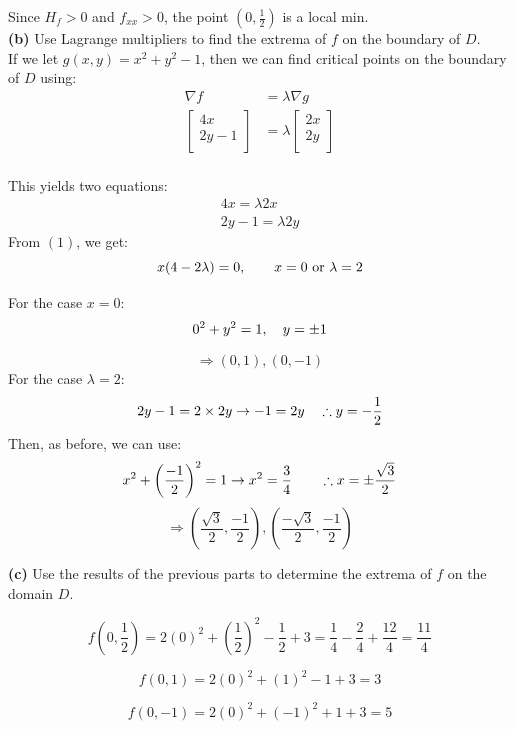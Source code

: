 \documentclass[12pt]{article}
\begin{document}
Since $H_f > 0$ and $f_{xx} > 0$, the point $(0, \frac{1}{2})$ is a local min.\\
\medskip
\textbf{(b)} Use Lagrange multipliers to find the extrema of $f$ on the boundary of $D$.\\
\medskip
If we let $g(x,y)=x^2+y^2-1$, then we can find critical points on the boundary of $D$ using:
\begin{align*}
\nabla f &= \lambda \nabla g \\
\begin{bmatrix}
4x \\
2y - 1 \\
\end{bmatrix} &= \lambda 
\begin{bmatrix}
2x \\
2y \\
\end{bmatrix} \\
\end{align*}

This yields two equations:
\begin{align}
	4x = \lambda 2x \\
	2y-1 = \lambda 2y
\end{align}
From $(1)$, we get:
$$
x(4-2\lambda) = 0, \hspace{20px} x = 0 \text{ or } \lambda = 2
$$ 

For the case $x = 0$:
$$
0^2+y^2=1, \hspace{10px} y=\pm 1
$$

$$
\Rightarrow \left( 0, 1 \right), \left( 0, -1 \right)
$$
For the case $\lambda = 2$:
$$
2y-1 = 2 \times 2y \rightarrow -1 = 2y \hspace{10px} \therefore y= -\frac{1}{2}
$$
Then, as before, we can use:
$$
x^2+ \left( \frac{-1}{2} \right)^2=1 \rightarrow x^2 = \frac{3}{4} \hspace{20px} \therefore x = \pm \frac{\sqrt{3}}{2}
$$
$$
\Rightarrow \left( \frac{\sqrt{3}}{2}, \frac{-1}{2} \right), \left( \frac{-\sqrt{3}}{2}, \frac{-1}{2} \right)
$$

\medskip
\textbf{(c)} Use the results of the previous parts to determine the extrema of $f$ on the domain $D$.\\
\medskip

$$
f\left(0, \frac{1}{2}\right)=2(0)^2+\left( \frac{1}{2} \right)^2-\frac{1}{2}+3=\frac{1}{4}-\frac{2}{4}+\frac{12}{4}=\frac{11}{4}
$$

$$
f(0, 1)=2(0)^2+(1)^2-1+3=3
$$

$$
f(0, -1)=2(0)^2+(-1)^2+1+3=5
$$
\end{document}
